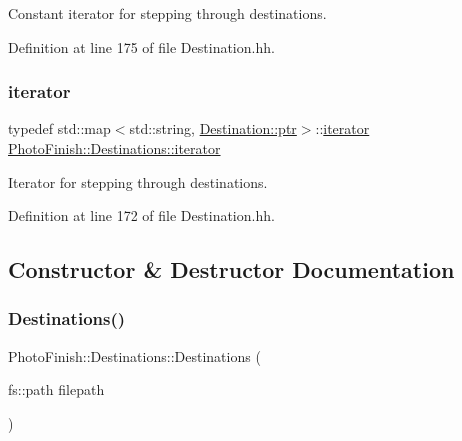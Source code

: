 Constant iterator for stepping through destinations. 



Definition at line 175 of file Destination.\+hh.

\mbox{\label{class_photo_finish_1_1_destinations_adb2cf9240b0d2545643caa2c1d718913}} 
\subsubsection{\texorpdfstring{iterator}{iterator}}
{\footnotesize\ttfamily typedef std\+::map$<$std\+::string, \hyperlink{class_photo_finish_1_1_destination_a0d282a905cd81c3f0e6d7233c9bc7774}{Destination\+::ptr}$>$\+::\hyperlink{class_photo_finish_1_1_destinations_adb2cf9240b0d2545643caa2c1d718913}{iterator} \hyperlink{class_photo_finish_1_1_destinations_adb2cf9240b0d2545643caa2c1d718913}{Photo\+Finish\+::\+Destinations\+::iterator}}



Iterator for stepping through destinations. 



Definition at line 172 of file Destination.\+hh.



\subsection{Constructor \& Destructor Documentation}
\mbox{\label{class_photo_finish_1_1_destinations_a454613582d7aea38d96b835a1550e597}} 
\subsubsection{\texorpdfstring{Destinations()}{Destinations()}\hspace{0.1cm}{\footnotesize\ttfamily [1/2]}}
{\footnotesize\ttfamily Photo\+Finish\+::\+Destinations\+::\+Destinations (\begin{DoxyParamCaption}\item[{fs\+::path}]{filepath }\end{DoxyParamCaption})}



